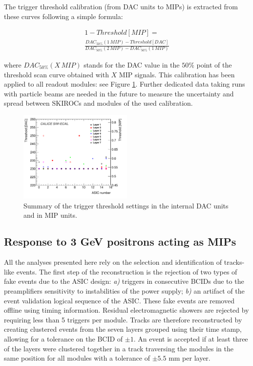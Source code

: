 \documentclass[final,3p,times,twocolumn]{elsarticle}
\begin{document}
The trigger threshold calibration (from DAC units to MIPs) is extracted from these curves following a simple formula:

\begin{equation}
	\begin{split}
1 -Threshold[MIP] = \\
\frac{DAC_{50\%}(1\,MIP)-Threshold[DAC]}{DAC_{50\%}(2\,MIP)-DAC_{50\%}(1\,MIP)}
	\end{split}
\end{equation} 

where $DAC_{50\%}(X\,MIP)$ stands for the DAC value in the $50\%$ point of the threshold scan curve obtained with $X$ MIP signals.
This calibration has been applied to all readout modules: see Figure \ref{trigger_thresholds}.
Further dedicated data taking runs with particle beams are needed in the future to measure the uncertainty and spread between SKIROCs and
modules of the used calibration.

\begin{figure}[h!t]
  \centering
  \includegraphics[width=0.5\textwidth]{threshold_chip-eps-converted-to.pdf}
  \caption{Summary of the trigger threshold settings in the internal DAC units and in MIP units.}
\label{trigger_thresholds}
\end{figure}



\subsection{Response to 3 GeV positrons acting as MIPs}
\label{sec:calib}

All the analyses presented here rely on the selection and identification
of tracks-like events. The first step of the reconstruction is the rejection
of two types of fake events due to the ASIC
design: {\it a)} triggers in consecutive BCIDs
due to the preamplifiers sensitivity to instabilities of the power supply; {\it b)}
an artifact of the event validation logical sequence of the ASIC. These fake
events are removed offline using timing information.
Residual electromagnetic showers are rejected by requiring
less than 5 triggers per module.
Tracks are therefore reconstructed by creating clustered
events from the seven layers grouped using their time stamp, allowing for a
tolerance on the BCID of $\pm1$. An event is accepted if at least
three of the layers were clustered together in a track traversing the modules in the
same position
for all modules with a tolerance of $\pm5.5$ {\rm mm} per layer.
\end{document}
